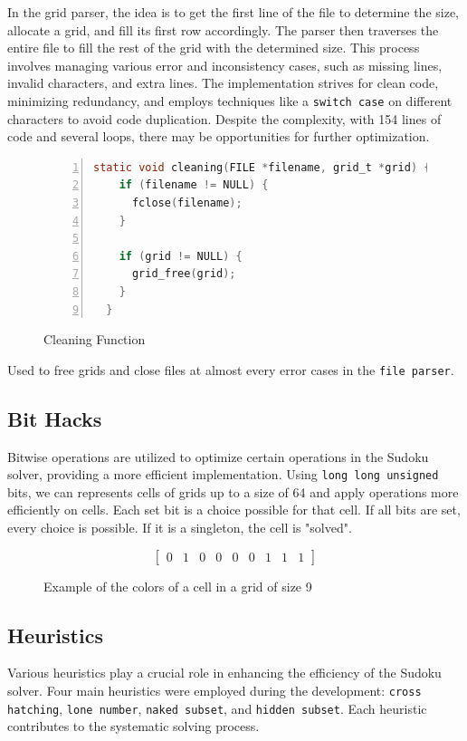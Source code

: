 \documentclass[a4paper, 11pt]{article}
\begin{document}
In the grid parser, the idea is to get the first line of the file to determine the size, allocate a grid, and fill its first row accordingly. The parser then traverses the entire file to fill the rest of the grid with the determined size. This process involves managing various error and inconsistency cases, such as missing lines, invalid characters, and extra lines. The implementation strives for clean code, minimizing redundancy, and employs techniques like a \texttt{switch case}  on different characters to avoid code duplication. Despite the complexity, with 154 lines of code and several loops, there may be opportunities for further optimization.

\begin{figure}[h]
  \centering
  \begin{lstlisting}[language=C, frame = single, numbers = left, label=code:Example]
  static void cleaning(FILE *filename, grid_t *grid) {
    if (filename != NULL) {
      fclose(filename);
    }

    if (grid != NULL) {
      grid_free(grid);
    }
  }
  \end{lstlisting}
  \caption{Cleaning Function}
  \end{figure}
Used to free grids and close files at almost every error cases in the \texttt{file parser}.

\subsection{Bit Hacks}
Bitwise operations are utilized to optimize certain operations in the Sudoku solver, providing a more efficient implementation. Using \texttt{long long unsigned} bits, we can represents cells of grids up to a size of 64 and apply operations more efficiently on cells.
Each set bit is a choice possible for that cell. If all bits are set, every choice is possible. If it is a singleton, the cell is "solved".

\begin{figure}[h]
\[
\begin{bmatrix}
0 & 1 & 0 & 0 & 0 & 0 & 1 & 1 & 1
\end{bmatrix}
\]
 \caption{Example of the colors of a cell in a grid of size 9}
\end{figure}



\subsection{Heuristics}
Various heuristics play a crucial role in enhancing the efficiency of the Sudoku solver. Four main heuristics were employed during the development: \texttt{cross hatching}, \texttt{lone number}, \texttt{naked subset}, and \texttt{hidden subset}. Each heuristic contributes to the systematic solving process.
\end{document}
